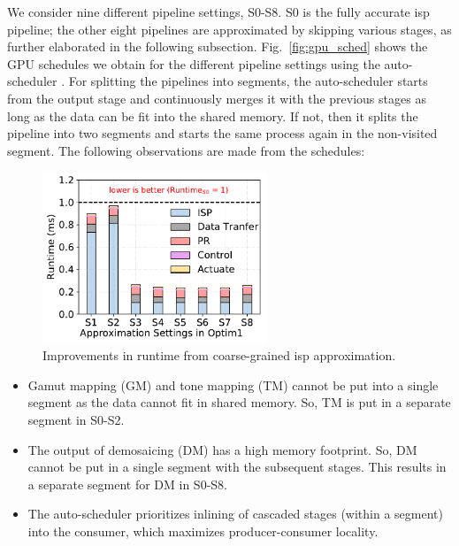 We consider nine different pipeline settings, S0-S8. S0 is the fully accurate \gls{isp} pipeline; the other eight pipelines are approximated by skipping various stages, as further elaborated in the following subsection.
Fig.\ \ref{fig:gpu_sched} shows the GPU schedules we obtain for the different pipeline settings using the auto-scheduler \cite{halide-auto}. For splitting the pipelines into segments, the auto-scheduler starts from the output stage and continuously merges it with the previous stages as long as the data can be fit into the shared memory. If not, then it splits the pipeline into two segments and starts the same process again in the non-visited segment. The following observations are made from the schedules:
\begin{figure}[t]
    \centering
		\includegraphics[width=0.6\textwidth]{figs/qoc_wtime_CPU_ALL_GPU2.pdf}
		\vspace{-7pt}
		\captionsetup{width=\textwidth}
		\caption{{Improvements in runtime from coarse-grained \gls{isp} approximation.}}
		\label{fig:qoc_runtime}
		\vspace{-9pt}
\end{figure}
\begin{itemize}
    \item Gamut mapping (GM) and tone mapping (TM) cannot be put into a single segment as the data cannot fit in shared memory. So, TM is put in a separate segment in S0-S2.
    \item The output of demosaicing (DM) has a high memory footprint. So, DM cannot be put in a single segment with the subsequent stages. This results in a separate segment for DM in S0-S8.
    \item The auto-scheduler prioritizes inlining of cascaded stages (within a segment) into the consumer, which maximizes  producer-consumer locality.
\end{itemize}

